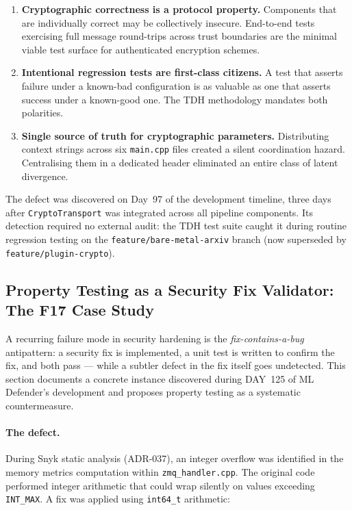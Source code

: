 \documentclass[11pt,a4paper]{article}
\begin{document}
    \begin{enumerate}
        \item \textbf{Cryptographic correctness is a protocol property.}
        Components that are individually correct may be collectively
        insecure. End-to-end tests exercising full message round-trips
        across trust boundaries are the minimal viable test surface for
        authenticated encryption schemes.

        \item \textbf{Intentional regression tests are first-class citizens.}
        A test that asserts failure under a known-bad configuration is as
        valuable as one that asserts success under a known-good one. The
        TDH methodology mandates both polarities.

        \item \textbf{Single source of truth for cryptographic parameters.}
        Distributing context strings across six \texttt{main.cpp} files
        created a silent coordination hazard. Centralising them in a
        dedicated header eliminated an entire class of latent divergence.
    \end{enumerate}

    The defect was discovered on Day~97 of the development timeline, three days
    after \texttt{CryptoTransport} was integrated across all pipeline components.
    Its detection required no external audit: the TDH test suite caught it during
    routine regression testing on the \texttt{feature/bare-metal-arxiv} branch
    (now superseded by \texttt{feature/plugin-crypto}).


    \subsection{Property Testing as a Security Fix Validator: The F17 Case Study}
    \label{subsec:property-testing-validator}

    A recurring failure mode in security hardening is the \emph{fix-contains-a-bug} antipattern:
    a security fix is implemented, a unit test is written to confirm the fix, and both pass ---
    while a subtler defect in the fix itself goes undetected. This section documents a concrete
    instance discovered during DAY~125 of ML Defender's development and proposes property testing
    as a systematic countermeasure.

    \paragraph{The defect.}
    During Snyk static analysis (ADR-037), an integer overflow was identified in the memory
    metrics computation within \texttt{zmq\_handler.cpp}. The original code performed integer
    arithmetic that could wrap silently on values exceeding \texttt{INT\_MAX}. A fix was
    applied using \texttt{int64\_t} arithmetic:
\end{document}
